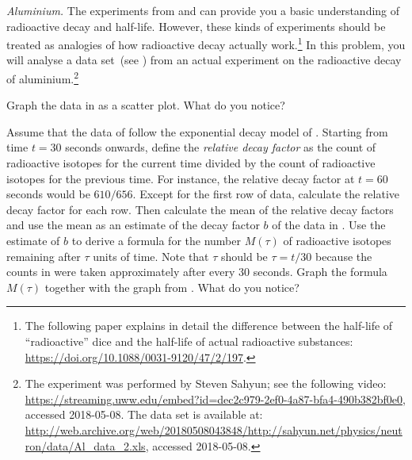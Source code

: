 \documentclass[a4paper,oneside,12pt]{article}
\begin{document}
\begin{problem}
\item\emph{Aluminium.}
  The experiments from  and
   can provide you a basic
  understanding of radioactive decay and half-life.  However, these
  kinds of experiments should be treated as analogies of how
  radioactive decay actually work.\footnote{
    The following paper explains in detail the difference between the
    half-life of ``radioactive'' dice and the half-life of actual
    radioactive substances:
    \url{https://doi.org/10.1088/0031-9120/47/2/197}.
  }
  In this problem, you will analyse a data set~(see
  ) from an actual experiment
  on the radioactive decay of aluminium.\footnote{
    The experiment was performed by Steven Sahyun; see the following
    video:
    \url{https://streaming.uww.edu/embed?id=dec2c979-2ef0-4a87-bfa4-490b382bf0e0},
    accessed 2018-05-08.  The data set is available at:
    \url{http://web.archive.org/web/20180508043848/http://sahyun.net/physics/neutron/data/Al_data_2.xls},
    accessed 2018-05-08.
  }
  \begin{packedenum}
  \item\label{subprob:aluminium_graph}
    Graph the data in  as a
    scatter plot.  What do you notice?

  \item\label{subprob:aluminium_mean_decay_factor}
    Assume that the data of 
    follow the exponential decay model of
    .  Starting from time $t = 30$
    seconds onwards, define the \emph{relative decay factor} as the
    count of radioactive isotopes for the current time divided by the
    count of radioactive isotopes for the previous time.  For
    instance, the relative decay factor at $t = 60$ seconds would be
    $610 / 656$.  Except for the first row of data, calculate the
    relative decay factor for each row.  Then calculate the mean of
    the relative decay factors and use the mean as an estimate of the
    decay factor $b$ of the data in
    .  Use the estimate of $b$
    to derive a formula for the number $M(\tau)$ of radioactive
    isotopes remaining after $\tau$ units of time.  Note that $\tau$
    should be $\tau = t / 30$ because the counts in
     were taken approximately
    after every $30$ seconds.  Graph the formula $M(\tau)$ together
    with the graph from .  What do you
    notice?


\end{packedenum}
\end{problem}
\end{document}
